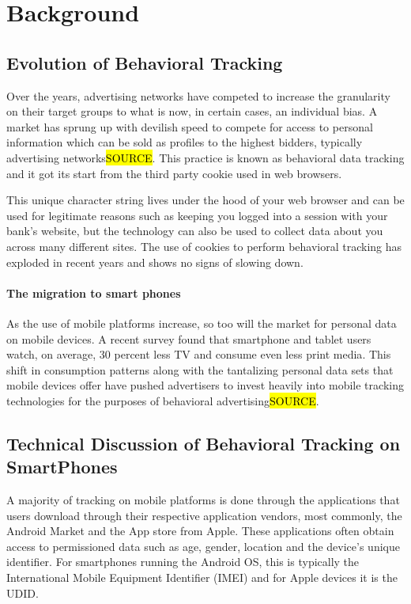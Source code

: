 \section{Background}

\subsection{Evolution of Behavioral Tracking}

Over the years, advertising networks have competed to increase the granularity on their target groups to what is now, in certain cases, an individual bias. A market has sprung up with devilish speed to compete for access to personal information which can be sold as profiles to the highest bidders, typically advertising networks\hl{SOURCE}. This practice is known as behavioral data tracking and it got its start from the third party cookie used in web browsers.

This unique character string lives under the hood of your web browser and can be used for legitimate reasons such as keeping you logged into a session with your bank’s website, but the technology can also be used to collect data about you across many different sites. The use of cookies to perform behavioral tracking has exploded in recent years and shows no signs of slowing down\cite{Cens2012}.

\paragraph{The migration to smart phones}
As the use of mobile platforms increase, so too will the market for personal data on mobile devices. A recent survey found that smartphone and tablet users watch, on average, 30 percent less TV and consume even less print media\cite{Abi2012}. This shift in consumption patterns along with the tantalizing personal data sets that mobile devices offer have pushed advertisers to invest heavily into mobile tracking technologies for the purposes of behavioral advertising\hl{SOURCE}.
   

\subsection{Technical Discussion of Behavioral Tracking on SmartPhones}

A majority of tracking on mobile platforms is done through the applications that users download through their respective application vendors, most commonly, the Android Market and the App store from Apple. These applications often obtain access to permissioned data such as age, gender, location and the device’s unique identifier. For smartphones running the Android OS, this is typically the International Mobile Equipment Identifier (IMEI) and for Apple devices it is the UDID.

